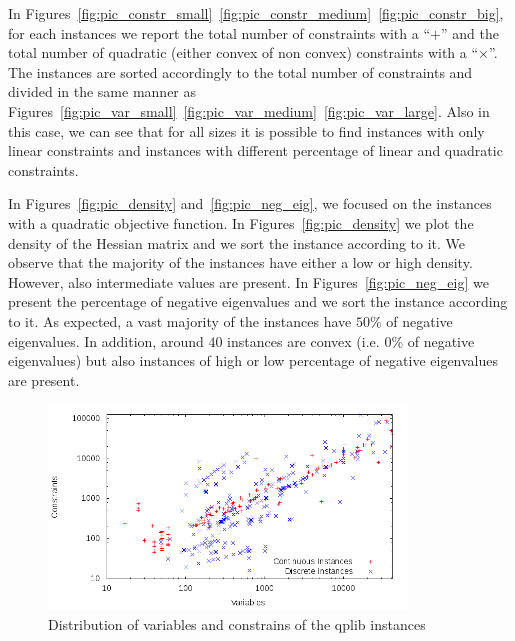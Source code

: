 In Figures~\ref{fig:pic_constr_small}~\ref{fig:pic_constr_medium}~\ref{fig:pic_constr_big},
for each instances we report the total number of constraints with a
``$+$'' and the total number of quadratic (either convex of non
convex) constraints with a ``$\times$''. The instances are sorted
accordingly to the total number of constraints  and divided in the
same manner as Figures~\ref{fig:pic_var_small}~\ref{fig:pic_var_medium}~\ref{fig:pic_var_large}.
Also in this case, we can see that for all sizes it is possible to
find instances with only linear constraints and instances with
different percentage of linear and quadratic constraints.

In Figures~\ref{fig:pic_density} and~\ref{fig:pic_neg_eig},  we
focused on the instances with a quadratic objective function.
In Figures~\ref{fig:pic_density} we plot the density of the Hessian
matrix and we sort the instance according to it. We observe that the
majority of the instances have either a low or high density. However,
also intermediate values are present.
In Figures~\ref{fig:pic_neg_eig} we present  the percentage of
negative eigenvalues and we sort the instance according to it. As
expected, a vast majority of the instances have $50\% $ of negative
eigenvalues. In addition, around $40$ instances are convex (i.e. $0\%$
of negative eigenvalues) but also instances of high or low percentage
of negative eigenvalues are present.





\begin{figure}\centering
  \includegraphics[width=0.85\textwidth]{pic_overview.png}
  \caption{Distribution of variables and constrains  of the qplib
instances \label{fig:1}}
\end{figure}

